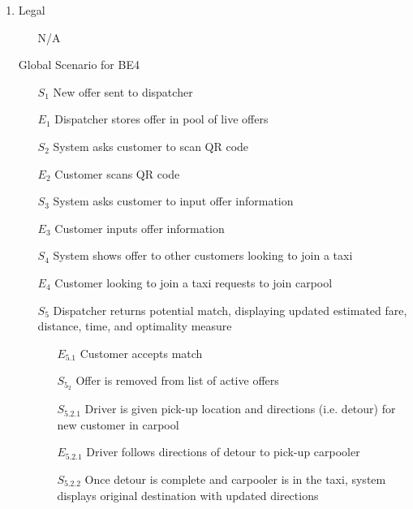 \documentclass[]{article}
\begin{document}
\begin{enumerate}[{\textbf{BE}}1.]
\begin{enumerate}[{VP4}.1]
\begin{enumerate}
                \item[N/A]
            \end{enumerate}
        \item Legal
            \begin{enumerate}
                \item[N/A]
            \end{enumerate}
        \item[Global] Scenario for BE4
            \begin{enumerate}
                \item[$S_1$] New offer sent to dispatcher
                \item[$E_1$] Dispatcher stores offer in pool of live offers
                \item[$S_2$] System asks customer to scan QR code
                \item[$E_2$] Customer scans QR code
                \item[$S_3$] System asks customer to input offer information
                \item[$E_3$] Customer inputs offer information
                \item[$S_4$] System shows offer to other customers looking to join a taxi
                \item[$E_4$] Customer looking to join a taxi requests to join carpool
                \item[$S_5$] Dispatcher returns potential match, displaying updated estimated fare, distance, time, and optimality measure
                \begin{enumerate}
                    \item[$E_{5.1}$] Customer accepts match
                      \item[$S_{5_2}$] Offer is removed from list of active offers
                    	\item[$S_{5.2.1}$] Driver is given pick-up location and directions (i.e. detour) for new customer in carpool
                    	\item[$E_{5.2.1}$] Driver follows directions of detour to pick-up carpooler
                    	\item[$S_{5.2.2}$] Once detour is complete and carpooler is in the taxi, system displays original destination with updated directions
               

\end{enumerate}
\end{enumerate}
\end{enumerate}
\end{enumerate}
\end{document}
